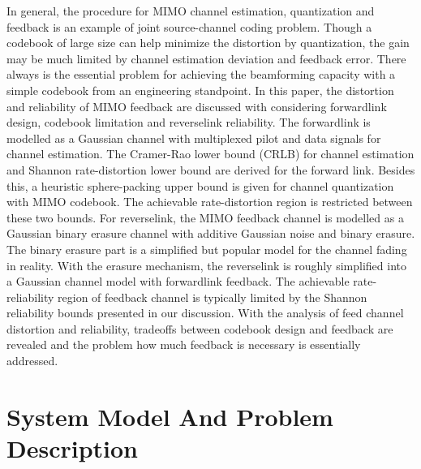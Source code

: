 \documentclass[10pt,fleqn, twocolumn]{IEEEtran}
\begin{document}
In general, the procedure for MIMO channel estimation,
quantization and feedback is an example of joint source-channel
coding problem. Though a codebook of large size can help minimize
the distortion by quantization, the gain may be much limited by
channel estimation deviation and feedback error. There always is
the essential problem for achieving the beamforming capacity with
a simple codebook from an engineering standpoint. In this paper,
the distortion and reliability of MIMO feedback are discussed with
considering forwardlink design, codebook limitation and
reverselink reliability. The forwardlink is modelled as a Gaussian
channel with multiplexed pilot and data signals for channel
estimation. The Cramer-Rao lower bound (CRLB) for channel
estimation and Shannon rate-distortion lower bound are derived for
the forward link. Besides this, a heuristic sphere-packing upper
bound is given for channel quantization with MIMO codebook. The
achievable rate-distortion region is restricted between these two
bounds. For reverselink, the MIMO feedback channel is modelled as
a Gaussian binary erasure channel with additive Gaussian noise and
binary erasure. The binary erasure part is a simplified but
popular model for the channel fading in reality. With the erasure
mechanism, the reverselink is roughly simplified into a Gaussian
channel model with forwardlink feedback. The achievable
rate-reliability region of feedback channel is typically limited
by the Shannon reliability bounds presented in our discussion.
With the analysis of feed channel distortion and reliability,
tradeoffs between codebook design and feedback are revealed and
the problem how much feedback is necessary is essentially
addressed.

\section{System Model And Problem Description\label{MIMO_system_model}}
\end{document}
